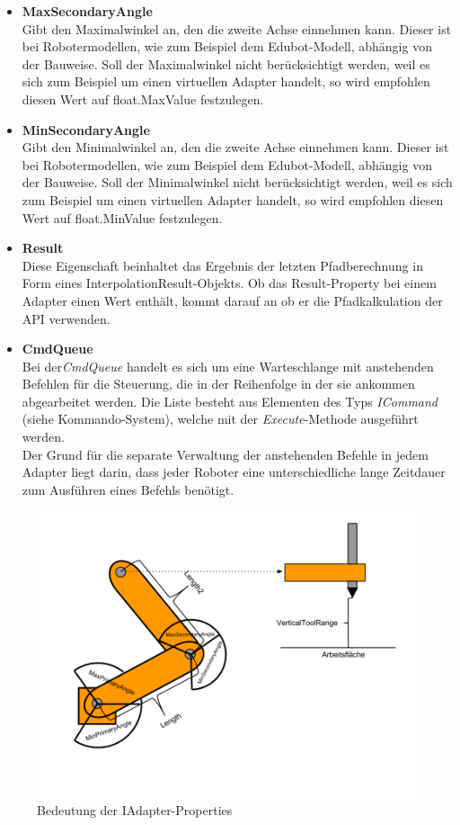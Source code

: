 \begin{itemize}
\item \textbf{MaxSecondaryAngle}\\
Gibt den Maximalwinkel an, den die zweite Achse einnehmen kann. Dieser ist bei Robotermodellen, wie zum Beispiel dem Edubot-Modell, abhängig von der Bauweise. Soll der Maximalwinkel nicht berücksichtigt werden, weil es sich zum Beispiel um einen virtuellen Adapter handelt, so wird empfohlen diesen Wert auf float.MaxValue festzulegen.
\item \textbf{MinSecondaryAngle}\\
Gibt den Minimalwinkel an, den die zweite Achse einnehmen kann. Dieser ist bei Robotermodellen, wie zum Beispiel dem Edubot-Modell, abhängig von der Bauweise. Soll der Minimalwinkel nicht berücksichtigt werden, weil es sich zum Beispiel um einen virtuellen Adapter handelt, so wird empfohlen diesen Wert auf float.MinValue festzulegen.
\item \textbf{Result}\\
Diese Eigenschaft beinhaltet das Ergebnis der letzten Pfadberechnung in Form eines InterpolationResult-Objekts. Ob das Result-Property bei einem Adapter einen Wert enthält, kommt darauf an ob er die Pfadkalkulation der API verwenden. 
\item \textbf{CmdQueue}\\
Bei der\textit{CmdQueue} handelt es sich um eine Warteschlange mit anstehenden Befehlen für die Steuerung, die in der Reihenfolge in der sie ankommen abgearbeitet werden. Die Liste besteht aus Elementen des Typs \textit{ICommand} (siehe Kommando-System), welche mit der \textit{Execute}-Methode ausgeführt werden.\\
Der Grund für die separate Verwaltung der anstehenden Befehle in jedem Adapter liegt darin, dass jeder Roboter eine unterschiedliche lange Zeitdauer zum Ausführen eines Befehls benötigt.
\end{itemize}

\begin{figure}[H]
  \centering
  \begin{minipage}[t]{12 cm}
  	\centering
  	\includegraphics[width=12cm]{images/AdapterProperties} 
    \caption{Bedeutung der IAdapter-Properties}
  \end{minipage}
\end{figure}

